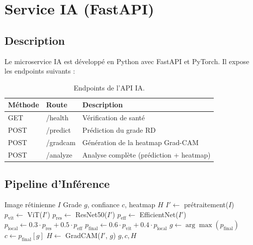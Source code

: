 \documentclass[12pt,a4paper,oneside]{report}
\begin{document}
\section{Service IA (FastAPI)}

\subsection{Description}

Le microservice IA est développé en Python avec FastAPI et PyTorch.
Il expose les endpoints suivants :

\begin{table}[H]
\centering
\caption{Endpoints de l'API IA.}
\label{tab:ai_endpoints}
\begin{tabular}{|l|l|p{6cm}|}
\hline
\textbf{Méthode} & \textbf{Route} & \textbf{Description} \\
\hline
GET & /health & Vérification de santé \\
POST & /predict & Prédiction du grade RD \\
POST & /gradcam & Génération de la heatmap Grad-CAM \\
POST & /analyze & Analyse complète (prédiction + heatmap) \\
\hline
\end{tabular}
\end{table}

\subsection{Pipeline d'Inférence}

\begin{algorithm}[H]
\caption{Pipeline d'inférence du service IA}
\label{algo:inference}
\begin{algorithmic}[1]
\Require Image rétinienne $I$
\Ensure Grade $g$, confiance $c$, heatmap $H$
\State $I' \leftarrow$ prétraitement($I$) 
\State $p_{\text{vit}} \leftarrow$ ViT($I'$) 
\State $p_{\text{res}} \leftarrow$ ResNet50($I'$) 
\State $p_{\text{eff}} \leftarrow$ EfficientNet($I'$) 
\State $p_{\text{local}} \leftarrow 0.3 \cdot p_{\text{res}} + 0.5 \cdot p_{\text{eff}}$
\State $p_{\text{final}} \leftarrow 0.6 \cdot p_{\text{vit}} + 0.4 \cdot p_{\text{local}}$
\State $g \leftarrow \arg\max(p_{\text{final}})$
\State $c \leftarrow p_{\text{final}}[g]$
\State $H \leftarrow$ GradCAM($I'$, $g$) 
\State \Return $g, c, H$
\end{algorithmic}
\end{algorithm}
\end{document}
